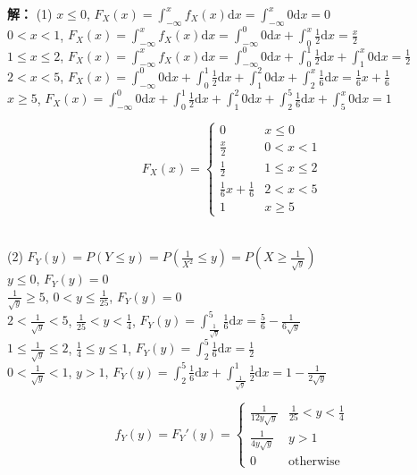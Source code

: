 \documentclass{article}
\begin{document}
	\begin{spacing}{2.0}
	\textbf{解：}
	(1)
	$x\leq 0$, 
	$F_X(x)=\int_{-\infty}^{x}f_X(x)\mathrm{d}x
	=\int_{-\infty}^{x}0\mathrm{d}x=0$\\
	$0<x<1$, 
	$F_X(x)=\int_{-\infty}^{x}f_X(x)\mathrm{d}x
	=\int_{-\infty}^{0}0\mathrm{d}x+\int_{0}^{x}\frac{1}{2}\mathrm{d}x
	=\frac{x}{2}$\\
	$1\leq x\leq 2$,
	$F_X(x)=\int_{-\infty}^{x}f_X(x)\mathrm{d}x
	=\int_{-\infty}^{0}0\mathrm{d}x+\int_{0}^{1}\frac{1}{2}\mathrm{d}x+\int_{1}^{x}0\mathrm{d}x
	=\frac{1}{2}$\\
	$2<x<5$, 
	$F_X(x)=\int_{-\infty}^{0}0\mathrm{d}x
	+\int_{0}^{1}\frac{1}{2}\mathrm{d}x
	+\int_{1}^{2}0\mathrm{d}x
	+\int_{2}^{x}\frac{1}{6}\mathrm{d}x
	=\frac{1}{6}x+\frac{1}{6}$\\
	$x\geq 5$,
	$F_X(x)=\int_{-\infty}^{0}0\mathrm{d}x
	+\int_{0}^{1}\frac{1}{2}\mathrm{d}x
	+\int_{1}^{2}0\mathrm{d}x
	+\int_{2}^{5}\frac{1}{6}\mathrm{d}x
	+\int_{5}^{x}0\mathrm{d}x
	=1$\\
	\begin{spacing}{1.0}
	\begin{equation}
		F_X(x)=\begin{cases}
		0 & x\leq 0\\
		\frac{x}{2} & 0<x<1\\
		\frac{1}{2} & 1\leq x\leq 2\\
		\frac{1}{6}x+\frac{1}{6} & 2<x<5\\
		1 & x\geq 5
		\end{cases}
	\end{equation}\\
	\end{spacing}

	(2)
	$F_Y(y)=P(Y\leq y)
	=P(\frac{1}{X^2}\leq y)
	=P(X\geq \frac{1}{\sqrt{y}})$\\
	$y\leq 0$, $F_Y(y)=0$\\
	$\frac{1}{\sqrt{y}}\geq 5$, $0<y\leq \frac{1}{25}$,
	$F_Y(y)=0$\\
	$2<\frac{1}{\sqrt{y}}< 5$, $\frac{1}{25}<y<\frac{1}{4}$,
	$F_Y(y)
	=\int_{\frac{1}{\sqrt{y}}}^{5}\frac{1}{6}\mathrm{d}x
	=\frac{5}{6}-\frac{1}{6\sqrt{y}}$\\
	$1\leq \frac{1}{\sqrt{y}}\leq 2$, $\frac{1}{4}\leq y\leq 1$,
	$F_Y(y)
	=\int_{2}^{5}\frac{1}{6}\mathrm{d}x
	=\frac{1}{2}$\\
	$0<\frac{1}{\sqrt{y}}< 1$, $y>1$,
	$F_Y(y)
	=\int_{2}^{5}\frac{1}{6}\mathrm{d}x+\int_{\frac{1}{\sqrt{y}}}^{1}\frac{1}{2}\mathrm{d}x
	=1-\frac{1}{2\sqrt{y}}$\\
	\begin{spacing}{1.0}
		\begin{equation}
			f_Y(y)=F_Y'(y)=\begin{cases}
			\frac{1}{12y\sqrt{y}} & \frac{1}{25}<y<\frac{1}{4}\\
			\frac{1}{4y\sqrt{y}} & y>1\\
			0 & \text{otherwise}
			\end{cases}
		\end{equation}\\
	\end{spacing}


\end{spacing}
\end{document}
